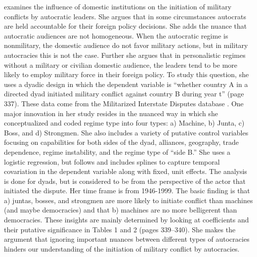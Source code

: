 \citet{weeks:2012} examines the influence of domestic institutions on the initiation of military conflicts by autocratic leaders.  She argues that in some circumstances autocrats are held accountable for their foreign policy decisions. She adds the nuance that autocratic audiences are not homogeneous. When the autocratic regime is nonmilitary, the domestic audience do not favor military actions, but in military autocracies this is not the case. Further she argues that in personalistic regimes without a military or civilian domestic audience, the leaders tend to be more likely to employ military force in their foreign policy.  To study this question, she uses a dyadic design in which the dependent variable is ``whether country A in a directed dyad initiated military conflict against country B during year t'' (page 337).  These data come from the Militarized Interstate Disputes database \citep{maoz:2005}.  One major innovation in her study resides in the nuanced way in which she conceptualized and coded regime type into four types: a) Machine, b) Junta, c) Boss, and d) Strongmen. She also includes a variety of putative control variables focusing on capabilities for both sides of the dyad, alliances, geography, trade dependence, regime instability, and the regime type of ``side B.''  She uses a logistic regression, but follows \citet{beck:etal:1998} and includes splines to capture temporal covariation in the dependent variable along with  fixed, unit effects. The analysis is done for dyads, but is considered to be from the perspective of the actor that initiated the dispute. Her time frame is from 1946-1999.  The basic finding is that a) juntas, bosses, and strongmen are more likely to initiate conflict than machines (and maybe democracies) and that b) machines are no more belligerent than democracies.  These insights are mainly determined by looking at coefficients and their putative significance in Tables 1 and 2 (pages 339--340). She makes the argument that ignoring important nuances between different types of autocracies hinders our understanding of the initiation of military conflict by autocracies. 

